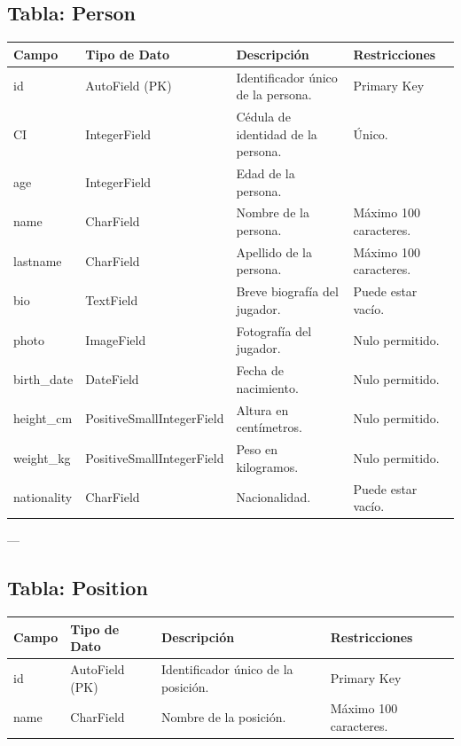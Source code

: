 \documentclass{report}
\begin{document}
    \subsection*{Tabla: Person}
    \begin{tabular}{|>{\raggedright\arraybackslash}p{3cm}|>{\raggedright\arraybackslash}p{3cm}|>{\raggedright\arraybackslash}p{6cm}|>{\raggedright\arraybackslash}p{4cm}|}
        \hline
        \textbf{Campo} & \textbf{Tipo de Dato} & \textbf{Descripción} & \textbf{Restricciones} \\
        \hline
        id & AutoField (PK) & Identificador único de la persona. & Primary Key \\
        \hline
        CI & IntegerField & Cédula de identidad de la persona. & Único. \\
        \hline
        age & IntegerField & Edad de la persona. &  \\
        \hline
        name & CharField & Nombre de la persona. & Máximo 100 caracteres. \\
        \hline
        lastname & CharField & Apellido de la persona. & Máximo 100 caracteres. \\
        \hline
        bio & TextField & Breve biografía del jugador. & Puede estar vacío. \\
        \hline
        photo & ImageField & Fotografía del jugador. & Nulo permitido. \\
        \hline
        birth\_date & DateField & Fecha de nacimiento. & Nulo permitido. \\
        \hline
        height\_cm & PositiveSmallIntegerField & Altura en centímetros. & Nulo permitido. \\
        \hline
        weight\_kg & PositiveSmallIntegerField & Peso en kilogramos. & Nulo permitido. \\
        \hline
        nationality & CharField & Nacionalidad. & Puede estar vacío. \\
        \hline
    \end{tabular}
    
    ---
    
    \subsection*{Tabla: Position}
    \begin{tabular}{|>{\raggedright\arraybackslash}p{3cm}|>{\raggedright\arraybackslash}p{3cm}|>{\raggedright\arraybackslash}p{6cm}|>{\raggedright\arraybackslash}p{4cm}|}
        \hline
        \textbf{Campo} & \textbf{Tipo de Dato} & \textbf{Descripción} & \textbf{Restricciones} \\
        \hline
        id & AutoField (PK) & Identificador único de la posición. & Primary Key \\
        \hline
        name & CharField & Nombre de la posición. & Máximo 100 caracteres. \\
        \hline
    \end{tabular}
    
\end{document}
